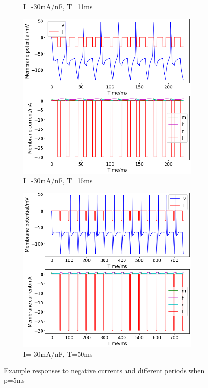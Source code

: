 \documentclass[twoside,twocolumn]{article}
\begin{document}
\begin{figure}[h]
\begin{subfigure}[t]{0.49\textwidth}
  \caption{I=-30mA/nF, T=11ms}
  \label{sub:2d30-11}
  \end{subfigure}
\newline
\begin{subfigure}[t]{0.49\textwidth}
    \includegraphics[width=\linewidth]{n30-15}
  \caption{I=-30mA/nF, T=15ms}
  \label{sub:2d30-15}
  \end{subfigure}
  \begin{subfigure}[t]{0.49\textwidth}
    \includegraphics[width=\linewidth]{n30-50}
  \caption{I=-30mA/nF, T=50ms}
  \label{sub:2d30-50}
  \end{subfigure}
  \caption{Example responses to negative currents and different periods when p=5ms}
  \label{fig:2d}
\end{figure}
\end{document}

